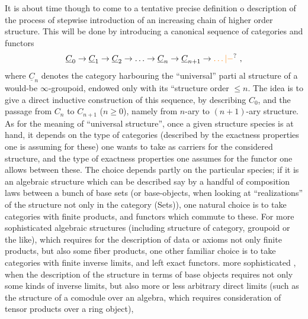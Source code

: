 It is about time though to come to a tentative precise definition o description of the process of stepwise introduction of an increasing chain of higher order structure. This will be done by introducing a canonical sequence of categories and functors
\[
\underline{C}_0\to\underline{C}_1\to\underline{C}_2\to\ldots\to\underline{C}_n\to\underline{C}_{n+1}\to\unsure{\ldots|-}\ ,
\]
where $\underline{C}_n$ denotes the  category harbouring the ``universal'' parti%
%
%
al structure of a would-be $\infty$-groupoid, endowed only with its ``structure order $\leq n$. The idea is to give a direct inductive construction of this sequence, by describing $C_0$, and the passage from $C_n$ to $C_{n+1}$ ($n\geq0$), namely from $n$-ary to $(n+1)$-ary structure. As for the meaning of ``universal structure'',  once a given structure species is at hand, it depends on the type of categories (described by the exactness properties one is assuming for these) one wants to take as carriers for the considered structure, and the type of exactness properties one assumes for the functor one allows between these. The choice depends partly on the particular species; if it is an algebraic structure which can be described say by a handful of composition laws between a bunch of base sets (or base-objects, when looking at ``realizations'' of the structure not only in the category (Sets)), one natural choice is to take categories with finite products, and functors which commute to these. For more sophisticated algebraic structures (including structure of category, groupoid or the like), which requires for the description of data or axioms not only finite products, but also some fiber products, one other familiar choice is to take categories with finite inverse limits, and left exact functors.  more sophisticated , when the description of the structure in terms of base objects requires not only some kinds of inverse limits, but also more or less arbitrary direct limits (such as the structure of a comodule over an algebra, which requires consideration of tensor products over a ring object),%
